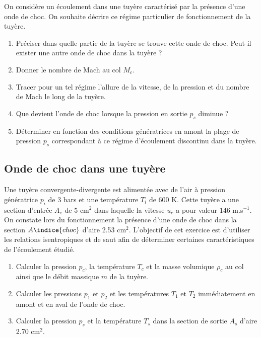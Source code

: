 On considère un \'ecoulement dans une tuyère caract\'eris\'e par la pr\'esence d'une onde de choc.
On souhaite d\'ecrire ce r\'egime particulier de fonctionnement de la tuyère.   
\begin{enumerate}
\item
Pr\'eciser dans quelle partie de la tuyère se trouve cette onde de choc.
Peut-il exister une autre onde de choc dans la tuyère ?
\item
Donner le nombre de Mach au col $M_c$.
\item
Tracer pour un tel r\'egime l'allure de la vitesse, de la pression et du nombre de Mach
le long de la tuyère.
\item
Que devient l'onde de choc lorsque la pression en sortie $p_s$ diminue ?
\item 
D\'eterminer en fonction des conditions g\'en\'eratrices en amont la plage
de pression $p_s$ correspondant à ce r\'egime d'\'ecoulement discontinu dans la tuyère.
\end{enumerate}
 
\subsection{Onde de choc dans une tuyère}

Une tuyère convergente-divergente est aliment\'ee avec de l'air à pression
g\'en\'eratrice $p_i$ de 3 bars et une temp\'erature $T_i$ de 600 K.
Cette tuyère a une section d'entr\'ee $A_e$ de 5 cm$^2$ dans laquelle la vitesse
$u_e$ a pour valeur 146 m.s$^{-1}$.
On constate lors du fonctionnement la pr\'esence d'une onde de choc dans
la section $A\indice{choc}$ d'aire 2.53 cm$^2$.
L'objectif de cet exercice est d'utiliser les relations isentropiques et de saut afin
de d\'eterminer certaines caract\'eristiques de l'\'ecoulement \'etudi\'e.
\begin{enumerate}
\item
  Calculer la pression $p_c$, la temp\'erature $T_c$ et la masse volumique $\rho_c$ au col ainsi
  que le d\'ebit massique $\dot{m}$ de la tuyère.
\item
  Calculer les pressions $p_1$ et $p_2$ et les temp\'eratures $T_1$ et $T_2$
  imm\'ediatement en amont et en aval de l'onde de choc.
\item
  Calculer la pression $p_s$ et la temp\'erature $T_s$ dans la section de sortie $A_s$ d'aire
  2.70 cm$^2$.
\end{enumerate}

 

